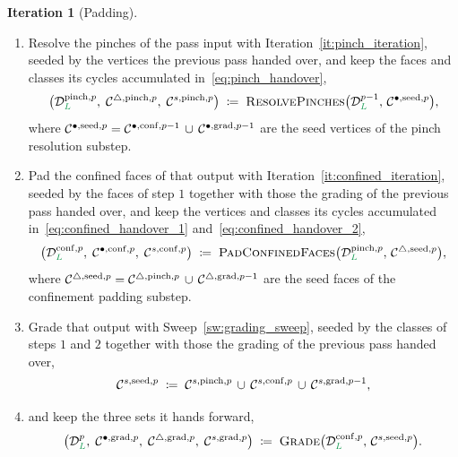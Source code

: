 \documentclass[a4paper, 12pt]{article}
\makeatletter
\DeclareRobustCommand{\candV}[1][]{\mathcal{C}^{\bullet\ifx\@empty#1\@empty\else,#1\fi}}
\DeclareRobustCommand{\candF}[1][]{\mathcal{C}^{\triangle\ifx\@empty#1\@empty\else,#1\fi}}
\DeclareRobustCommand{\candC}[1][]{\mathcal{C}^{s\ifx\@empty#1\@empty\else,#1\fi}}
\newcommand{\green}{\color{ForestGreen}}
\renewcommand{\L}{{\green L}}
\theoremstyle{definition}
\newtheorem{iteration}[theorem]{Iteration}
\theoremstyle{plain}
\numberwithin{equation}{section}
\DeclareRobustCommand{\domseq}[1][]{\mathcal{D}\ifx\@empty#1\@empty\else_{#1}\fi}
\makeatother
\begin{document}
\begin{iteration}[Padding]
    \begin{enumerate}[topsep=3pt, itemsep=-2pt]
    \item Resolve the pinches of the pass input with Iteration~\ref{it:pinch_iteration}, seeded by the vertices the previous pass handed over, and keep the faces and classes its cycles accumulated in~\eqref{eq:pinch_handover},
    \begin{equation}
        \label{eq:pad_step_pinch}
        \big( \domseq[\L]^{\mathrm{pinch},p}, \; \candF[\mathrm{pinch},p], \; \candC[\mathrm{pinch},p] \big) \; \coloneq \; \textsc{ResolvePinches} \big( \domseq[\L]^{p-1}, \, \candV[\mathrm{seed},p] \big) ,
    \end{equation}
    where $\candV[\mathrm{seed},p] = \candV[\mathrm{conf},p-1] \, \cup \, \candV[\mathrm{grad},p-1]$ are the seed vertices of the pinch resolution substep.
    \item Pad the confined faces of that output with Iteration~\ref{it:confined_iteration}, seeded by the faces of step $1$ together with those the grading of the previous pass handed over, and keep the vertices and classes its cycles accumulated in~\eqref{eq:confined_handover_1} and~\eqref{eq:confined_handover_2},
    \begin{equation}
        \label{eq:pad_step_confined}
        \big( \domseq[\L]^{\mathrm{conf},p}, \; \candV[\mathrm{conf},p], \; \candC[\mathrm{conf},p] \big) \; \coloneq \; \textsc{PadConfinedFaces} \big( \domseq[\L]^{\mathrm{pinch},p}, \, \candF[\mathrm{seed},p] \big),
    \end{equation}
    where $\candF[\mathrm{seed},p] =  \candF[\mathrm{pinch},p] \, \cup \, \candF[\mathrm{grad},p-1]$ are the seed faces of the confinement padding substep.
    \item Grade that output with Sweep~\ref{sw:grading_sweep}, seeded by the classes of steps $1$ and $2$ together with those the grading of the previous pass handed over,
    \begin{equation}
        \label{eq:pad_step_grading_seed}
        \candC[\mathrm{seed},p] \; \coloneq \; \candC[\mathrm{pinch},p] \, \cup \, \candC[\mathrm{conf},p] \, \cup \, \candC[\mathrm{grad},p-1] ,
    \end{equation}
    \vspace{-7mm}
    \item[] and keep the three sets it hands forward,
    \begin{equation}
        \label{eq:pad_step_grading}
        \big( \domseq[\L]^{p}, \; \candV[\mathrm{grad},p], \; \candF[\mathrm{grad},p], \; \candC[\mathrm{grad},p] \big) \; \coloneq \; \textsc{Grade} \big( \domseq[\L]^{\mathrm{conf},p}, \, \candC[\mathrm{seed},p] \big) .

\end{equation}
\end{enumerate}
\end{iteration}
\end{document}
